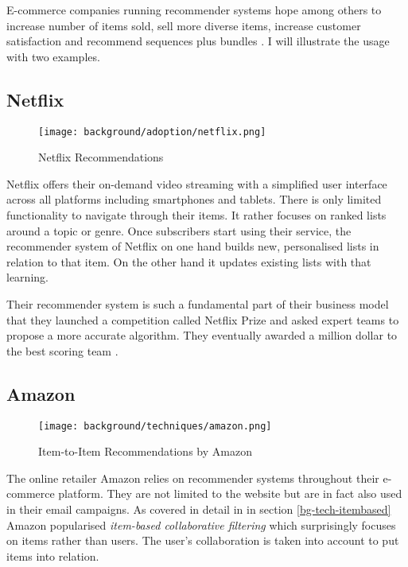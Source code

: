 E-commerce companies running recommender systems hope among others to increase number of items sold, sell more diverse items, increase customer satisfaction and recommend sequences plus bundles \cite{herlocker04}. I will illustrate the usage with two examples.

\subsection{Netflix}

\begin{figure}[ht]
    \texttt{[image: background/adoption/netflix.png]}
    \caption{Netflix Recommendations}
    \label{fig:netflix}
\end{figure}

Netflix offers their on-demand video streaming with a simplified user interface across all platforms including smartphones and tablets. There is only limited functionality to navigate through their items. It rather focuses on ranked lists around a topic or genre. Once subscribers start using their service, the recommender system of Netflix on one hand builds new, personalised lists in relation to that item. On the other hand it updates existing lists with that learning.

Their recommender system is such a fundamental part of their business model that they launched a competition called Netflix Prize and asked expert teams to propose a more accurate algorithm. They eventually awarded a million dollar to the best scoring team \cite{netflix09}.

\subsection{Amazon}
\label{bg-adopt-amazon}

\begin{figure}[ht]
    \texttt{[image: background/techniques/amazon.png]}
    \caption{Item-to-Item Recommendations by Amazon}
    \label{fig:itembased-amazon}
\end{figure}

The online retailer Amazon relies on recommender systems throughout their e-commerce platform. They are not limited to the website but are in fact also used in their email campaigns. As covered in detail in in section \ref{bg-tech-itembased} Amazon popularised \textit{item-based collaborative filtering} which surprisingly focuses on items rather than users. The user's collaboration is taken into account to put items into relation.



